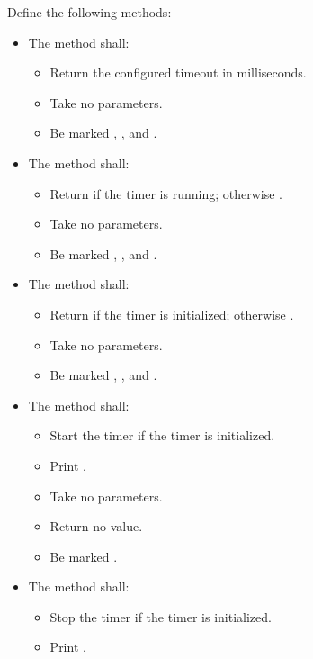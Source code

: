 \begin{parts}
  \item Define the following methods:
  \begin{itemize}
    \item The method  shall:
    \begin{itemize}
      \item Return the configured timeout in milliseconds.
      \item Take no parameters.
      \item Be marked , , and \code{[[nodiscard]]}.
    \end{itemize}
    \item The method  shall:
    \begin{itemize}
      \item Return  if the timer is running; otherwise .
      \item Take no parameters.
      \item Be marked , , and \code{[[nodiscard]]}.
    \end{itemize}
    \item The method  shall:
    \begin{itemize}
      \item Return  if the timer is initialized; otherwise .
      \item Take no parameters.
      \item Be marked , , and \code{[[nodiscard]]}.
    \end{itemize}
    \item The method  shall:
    \begin{itemize}
      \item Start the timer if the timer is initialized.
      \item Print .
      \item Take no parameters.
      \item Return no value.
      \item Be marked .
    \end{itemize}
    \item The method  shall:
    \begin{itemize}
      \item Stop the timer if the timer is initialized.
      \item Print .

\end{itemize}
\end{itemize}
\end{parts}
